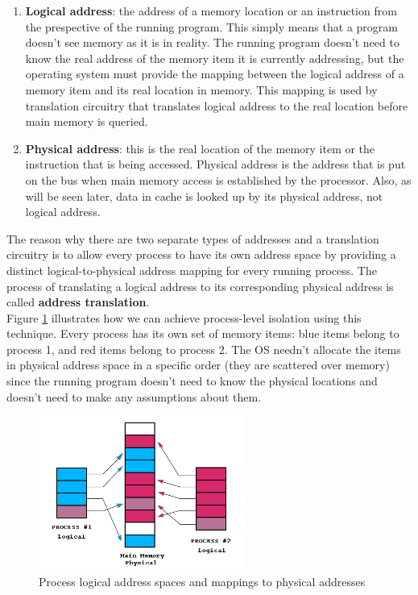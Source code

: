 \documentclass[oneside]{book}
\begin{document}
\begin{enumerate}

\item \textbf{Logical address}: the address of a memory location or
an instruction from the prespective of the running program. This simply
means that a program doesn't see memory as it is in reality. The
running program doesn't need to know the real address of the memory
item it is currently addressing, but the operating system must
provide the mapping between the logical address of a memory item
and its real location in memory. This mapping is used by translation
circuitry that translates logical address to the real location
before main memory is queried.

\item \textbf{Physical address}: this is the real location of
the memory item or the instruction that is being accessed. Physical
address is the address that is put on the bus when main memory
access is established by the processor. Also, as will be seen later,
data in cache is looked up by its physical address, not
logical address.

\end{enumerate}

The reason why there are two separate types of addresses and a translation
circuitry is to allow every process to have its own address space by
providing a distinct logical-to-physical address mapping for every
running process. The process of translating a logical address
to its corresponding physical address is called
\textbf{address translation}. \\

Figure \ref{translation} illustrates how we can
achieve process-level isolation using this technique.
Every process has its own set of memory items: blue items belong
to process 1, and red items belong to process 2. The OS needn't
allocate the items in physical address space in a specific order
(they are scattered over memory) since the running program
doesn't need to know the physical locations and doesn't need
to make any assumptions about them.\\

\begin{figure}[H]
\begin{center}
\includegraphics[width=0.6\textwidth]{translation.png}
\end{center}
\caption{Process logical address spaces and mappings to physical addresses}
\label{translation}
\end{figure}
\end{document}
